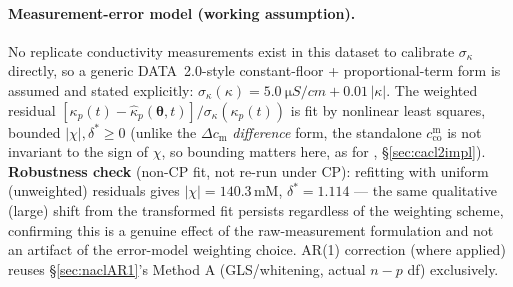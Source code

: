\documentclass[11pt]{article}
\newcommand{\cm}[1]{{c^{\mathrm{m}}_{#1}}}
\newcommand{\co}{\mathrm{co}}
\newcommand{\dstar}{\delta^{*}}
\begin{document}
\paragraph{Measurement-error model (working assumption).} No replicate
conductivity measurements exist in this dataset to calibrate
$\sigma_\kappa$ directly, so a generic DATA~2.0-style constant-floor +
proportional-term form is assumed and stated explicitly:
$\sigma_\kappa(\kappa)=\SI{5.0}{\micro S/cm} + 0.01\,|\kappa|$. The weighted
residual $[\kappa_p(t)-\hat\kappa_p(\boldsymbol\theta,t)]/\sigma_\kappa(\kappa_p(t))$
is fit by nonlinear least squares, bounded $|\chi|,\dstar\ge0$ (unlike the
$\Delta c_{\mathrm m}$ \emph{difference} form, the standalone $\cm{\co}$ is not
invariant to the sign of $\chi$, so bounding matters here, as for
, \S\ref{sec:cacl2impl}). \textbf{Robustness check} (non-CP fit,
not re-run under CP): refitting with uniform (unweighted) residuals gives
$|\chi|=140.3$\,mM, $\dstar=1.114$ --- the same qualitative (large) shift
from the transformed fit persists regardless of the weighting scheme,
confirming this is a genuine effect of the raw-measurement formulation and
not an artifact of the error-model weighting choice. AR(1) correction (where
applied) reuses \S\ref{sec:naclAR1}'s Method A (GLS/whitening, actual $n-p$
df) exclusively.
\end{document}
